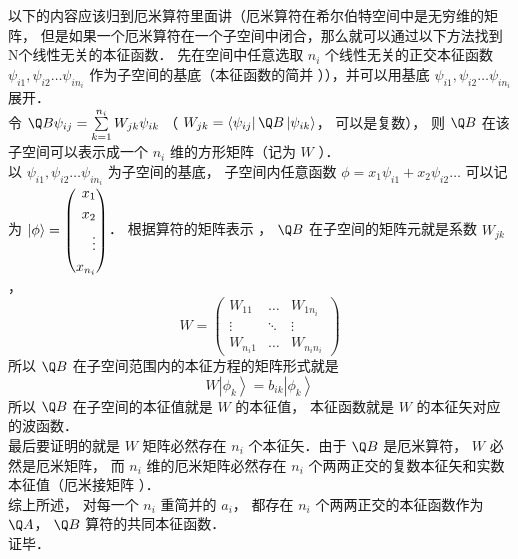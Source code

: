 以下的内容应该归到厄米算符里面讲（厄米算符在希尔伯特空间中是无穷维的矩阵， 但是如果一个厄米算符在一个子空间中闭合，那么就可以通过以下方法找到N个线性无关的本征函数．%
先在空间中任意选取 $n_i$ 个线性无关的正交本征函数 ${\psi _{i1}}, {\psi _{i2}}\dots{\psi _{i{n_i}}}$ 作为子空间的基底（本征函数的简并%
）），并可以用基底 ${\psi _{i1}},{\psi _{i2}}\dots{\psi _{i{n_i}}}$ 展开．\\
令 $\Q B{\psi _{ij}} = \sum\limits_{k = 1}^{{n_i}} {{W_{jk}}{\psi _{ik}}} $ （ ${W_{jk}} = \left\langle {{\psi _{ij}}} \right|\Q B\left| {{\psi _{ik}}} \right\rangle $， 可以是复数）， 则 $\Q B$ 在该子空间可以表示成一个 $n_i$ 维的方形矩阵（记为 $W$ ）．\\
以 ${\psi _{i1}}, {\psi _{i2}}\dots{\psi _{i{n_i}}}$ 为子空间的基底， 子空间内任意函数 $\phi  = {x_1}{\psi _{i1}} + {x_2}{\psi _{i2}}\dots$ 可以记为 $\left| \phi  \right\rangle  = \left( \begin{aligned}
{x_1}\\
{x_2}\\
{\kern 1pt} {\kern 1pt} {\kern 1pt}  \vdots \\
{x_{{n_i}}}
\end{aligned} \right)$． 根据算符的矩阵表示%
， $\Q B$ 在子空间的矩阵元就是系数 ${W_{jk}}$， 
\begin{equation}
  W = \left( {\begin{aligned}
{{W_{11}}}& \ldots &{{W_{1{n_i}}}}\\
 \vdots & \ddots & \vdots \\
{{W_{{n_i}1}}}& \ldots &{{W_{{n_i}{n_i}}}}
\end{aligned}} \right)
\end{equation}
所以 $\Q B$ 在子空间范围内的本征方程的矩阵形式就是
\begin{equation}
  W\left| {{\phi _k}} \right\rangle  = {b_{ik}}\left| {{\phi _k}} \right\rangle 
\end{equation}
所以 $\Q B$ 在子空间的本征值就是 $W$ 的本征值， 本征函数就是 $W$ 的本征矢对应的波函数．\\
最后要证明的就是 $W$ 矩阵必然存在 $n_i$ 个本征矢．由于 $\Q B$ 是厄米算符，  $W$ 必然是厄米矩阵， 而 $n_i$ 维的厄米矩阵必然存在 $n_i$ 个两两正交的复数本征矢和实数本征值（厄米接矩阵%
）．\\
综上所述， 对每一个 $n_i$ 重简并的 $a_i$，  都存在 $n_i$ 个两两正交的本征函数作为 $\Q A$，  $\Q B$ 算符的共同本征函数．\\
证毕．\\

